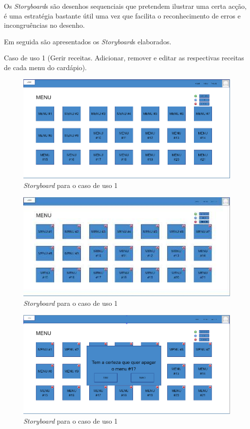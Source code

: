Os \textit{Storyboard}s são desenhos sequenciais que pretendem ilustrar uma certa acção, é uma estratégia bastante útil uma vez que facilita o reconhecimento de erros e incongruências no desenho.

Em seguida são apresentados os \textit{Storyboard}s elaborados.

Caso de uso 1 (Gerir receitas. Adicionar, remover e editar as respectivas receitas de cada menu do cardápio).


\begin{figure}[!hbt]
    \centering
    \includegraphics[width=14cm]{Resources/Previous/image-100.png}
    \caption{\textit{Storyboard} para o caso de uso 1}
    
\end{figure}
\FloatBarrier
\begin{figure}[!hbt]
    \centering
    \includegraphics[width=14cm]{Resources/Previous/image-101.jpg}
    \caption{\textit{Storyboard} para o caso de uso 1}
    
\end{figure}
\FloatBarrier
\begin{figure}[!hbt]
    \centering
    \includegraphics[width=14cm]{Resources/Previous/image-102.png}
    \caption{\textit{Storyboard} para o caso de uso 1}
    
\end{figure}
